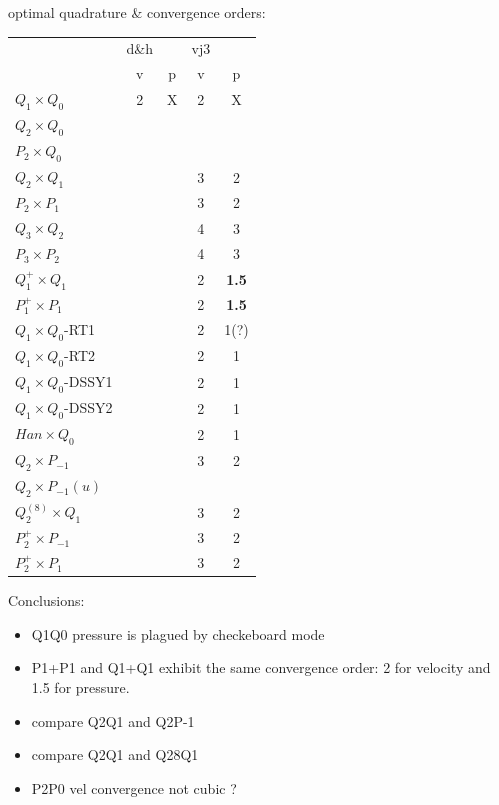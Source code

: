 \newpage
optimal quadrature \& convergence orders:

\begin{center}
\begin{tabular}{l|cc|cc|}
\hline
                     & d\&h &   & vj3 & \\
                     & v    & p & v & p \\
\hline
\hline
$Q_1\times Q_0$       & 2    & X & 2 & X  \\%
$Q_2\times Q_0$       &     &  &  &   \\%
$P_2\times Q_0$       &     &  &  &   \\%
$Q_2\times Q_1$       &      &   & 3 & 2  \\%
$P_2\times P_1$       &      &   & 3 & 2  \\%
$Q_3\times Q_2$       &      &   & 4 & 3  \\%
$P_3\times P_2$       &      &   & 4 & 3  \\%
$Q_1^+\times Q_1$     &      &   & 2 & {\bf 1.5}  \\%
$P_1^+\times P_{1}$   &      &   & 2 & {\bf 1.5}  \\%
$Q_1\times Q_0$-RT1   &      &   & 2 & 1(?)\\%
$Q_1\times Q_0$-RT2   &      &   & 2 & 1   \\%
$Q_1\times Q_0$-DSSY1 &      &   & 2 & 1   \\%
$Q_1\times Q_0$-DSSY2 &      &   & 2 & 1   \\%
$Han\times Q_0$       &      &   & 2 & 1   \\%
$Q_2\times P_{-1}$    &      &   & 3 & 2   \\%
$Q_2\times P_{-1}(u)$ &      &   &  &      \\%
$Q_2^{(8)}\times Q_1$ &      &   & 3 & 2   \\%
$P_2^+\times P_{-1}$  &      &   & 3 & 2   \\%
$P_2^+\times P_{1}$   &      &   & 3 & 2   \\%
\hline
\end{tabular} 
\end{center}

\vspace{1cm}

Conclusions:
\begin{itemize}
\item Q1Q0 pressure is plagued by checkeboard mode
\item P1+P1 and Q1+Q1 exhibit the same convergence order: 2 for velocity and 1.5 for pressure.
\item compare Q2Q1 and Q2P-1
\item compare Q2Q1 and Q28Q1
\item P2P0 vel convergence not cubic ?
\end{itemize}

